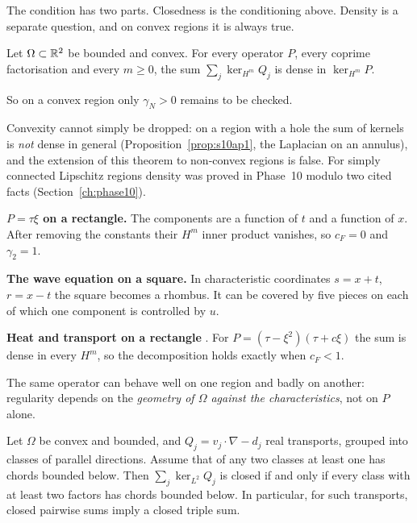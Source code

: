 The condition has two parts. Closedness is the conditioning above. Density is a separate question, and on convex regions it is always true.

\begin{theorem}\label{thm:density}
Let $\Omega\subset\mathbb{R}^2$ be bounded and convex. For every operator $P$, every coprime factorisation and every $m\ge0$, the sum $\sum_j\ker_{H^m}Q_j$ is dense in $\ker_{H^m}P$.

\end{theorem}

So on a convex region only $\gamma_N>0$ remains to be checked.

\begin{caution}[title=Added in the complete edition (Phase 10)]
Convexity cannot simply be dropped: on a region with a hole the sum of kernels is \emph{not} dense in general (Proposition~\ref{prop:s10ap1}, the Laplacian on an annulus), and the extension of this theorem to non-convex regions is false. For simply connected Lipschitz regions density was proved in Phase~10 modulo two cited facts (Section~\ref{ch:phase10}).
\end{caution}

\begin{example}
\textbf{$P=\tau\xi$ on a rectangle.} The components are a function of $t$ and a function of $x$. After removing the constants their $H^m$ inner product vanishes, so $c_F=0$ and $\gamma_2=1$.

\textbf{The wave equation on a square.} In characteristic coordinates $s=x+t$, $r=x-t$ the square becomes a rhombus. It can be covered by five pieces on each of which one component is controlled by $u$.

\textbf{Heat and transport on a rectangle}  \pw. For $P=(\tau-\xi^2)(\tau+c\xi)$ the sum is dense in every $H^m$, so the decomposition holds exactly when $c_F<1$.

The same operator can behave well on one region and badly on another: regularity depends on the \emph{geometry of $\Omega$ against the characteristics}, not on $P$ alone.

\end{example}

\begin{proposition}[{Real transports, $m=0$ \led{OPR2-T2} \pw}]\label{prop:transports}
Let $\Omega$ be convex and bounded, and $Q_j=v_j\cdot\nabla-d_j$ real transports, grouped into classes of parallel directions. Assume that of any two classes at least one has chords bounded below. Then $\sum_j\ker_{L^2}Q_j$ is closed if and only if every class with at least two factors has chords bounded below. In particular, for such transports, closed pairwise sums imply a closed triple sum.

\end{proposition}


